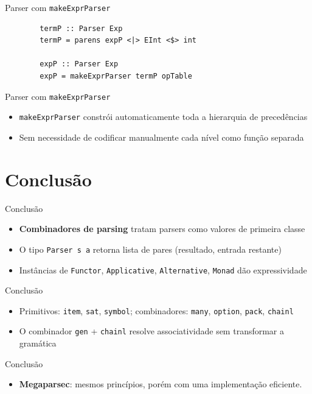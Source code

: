 \begin{frame}[fragile]{Parser com
    \texttt{makeExprParser}}

    \begin{lstlisting}
        termP :: Parser Exp
        termP = parens expP <|> EInt <$> int

        expP :: Parser Exp
        expP = makeExprParser termP opTable
    \end{lstlisting}
\end{frame}

\begin{frame}[fragile]{Parser com
    \texttt{makeExprParser}}

    \begin{itemize}

        \item
        \texttt{makeExprParser} constrói automaticamente toda
        a hierarquia de precedências
        \item
        Sem necessidade de codificar manualmente cada nível como função
        separada
    \end{itemize}
\end{frame}


\section{Conclusão}\label{conclusuxe3o}

\begin{frame}[fragile]{Conclusão}

    \begin{itemize}

        \item
        \textbf{Combinadores de parsing} tratam parsers como valores de
        primeira classe
        \item
        O tipo \texttt{Parser s a} retorna lista de pares
        (resultado, entrada restante)
        \item
        Instâncias de \texttt{Functor},
        \texttt{Applicative},
        \texttt{Alternative}, \texttt{Monad}
        dão expressividade
    \end{itemize}
\end{frame}

\begin{frame}[fragile]{Conclusão}

    \begin{itemize}

        \item
        Primitivos: \texttt{item},
        \texttt{sat}, \texttt{symbol};
        combinadores: \texttt{many},
        \texttt{option}, \texttt{pack},
        \texttt{chainl}
        \item
        O combinador \texttt{gen} +
        \texttt{chainl} resolve associatividade sem
        transformar a gramática
    \end{itemize}
\end{frame}

\begin{frame}{Conclusão}

    \begin{itemize}

        \item
        \textbf{Megaparsec}: mesmos princípios, porém com uma implementação
        eficiente.
    \end{itemize}
\end{frame}
